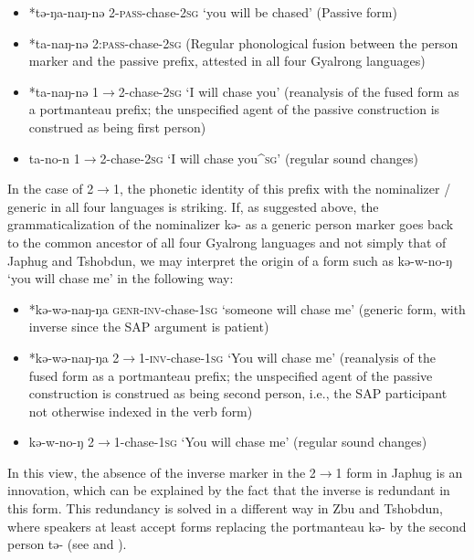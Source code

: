 \documentclass[oldfontcommands,oneside,a4paper,11pt]{article}
\newcommand{\ipa}[1]{{\phon \mbox{#1}}} %
\begin{document}
\begin{itemize}
\item *\ipa{tə-ŋa-naŋ-nə}  2-\textsc{pass}-chase-\textsc{2sg} `you will be chased' (Passive form)
\item *\ipa{ta-naŋ-nə}  2:\textsc{pass}-chase-\textsc{2sg} (Regular phonological fusion between the person marker and the passive prefix, attested in all four Gyalrong languages)  
\item  *\ipa{ta-naŋ-nə}  1$\rightarrow$2-chase-\textsc{2sg} `I will chase you' (reanalysis of the fused form as a portmanteau prefix; the unspecified agent of the passive construction is construed as being first person)
\item  \ipa{ta-no-n} 1$\rightarrow$2-chase-\textsc{2sg} `I will chase you^{\textsc{sg}}' (regular sound changes)
\end{itemize}


In the case of 2$\rightarrow$1, the phonetic identity of this prefix with the nominalizer / generic in all four languages is striking. If, as suggested above, the grammaticalization of the nominalizer \ipa{kə-} as a generic person marker goes back to the common ancestor of all four Gyalrong languages and not simply that of Japhug and Tshobdun, we may interpret the origin of a form such as \ipa{kə-w-no-ŋ} `you will chase me' in the following way:


\begin{itemize}
\item *\ipa{kə-wə-naŋ-ŋa}  \textsc{genr}-\textsc{inv}-chase-\textsc{1sg} `someone will chase me' (generic form, with inverse since the SAP argument is patient)
\item  *\ipa{kə-wə-naŋ-ŋa}  2$\rightarrow$1-\textsc{inv}-chase-\textsc{1sg} `You will chase me' (reanalysis of the fused form as a portmanteau prefix; the unspecified agent of the passive construction is construed as being second person, i.e., the SAP participant not otherwise indexed in the verb form)
\item  \ipa{kə-w-no-ŋ} 2$\rightarrow$1-chase-\textsc{1sg} `You will chase me'  (regular sound changes)
\end{itemize}

In this view, the absence of the inverse marker in the  2$\rightarrow$1 form in Japhug is an innovation, which can be explained by the fact that the inverse is redundant in this form. This redundancy is solved in a different way in Zbu and Tshobdun, where speakers at least accept forms replacing the portmanteau \ipa{kə-} by the second person \ipa{tə-} (see \citealt{jackson02rentongdengdi} and \citealt{gongxun14agreement}).
 
\end{document}
